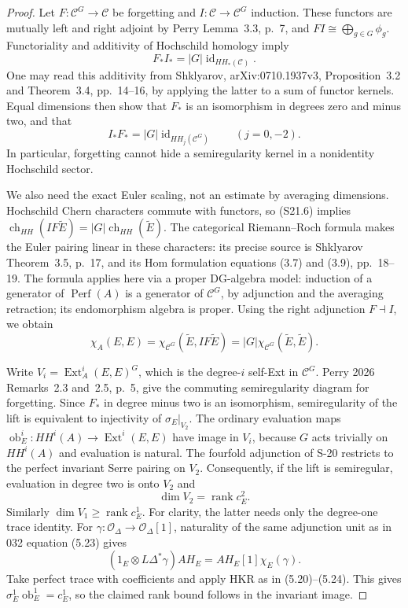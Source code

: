 \documentclass[11pt,a4paper]{article}
\theoremstyle{definition}
\begin{document}
\begin{proof}
Let $F:\mathcal C^G\to\mathcal C$ be forgetting and
$I:\mathcal C\to\mathcal C^G$ induction. These functors
are mutually left and right adjoint by Perry Lemma~3.3,
p.~7, and $FI\cong\bigoplus_{g\in G}\phi_g$.
Functoriality and additivity of Hochschild homology imply
\[
 F_*I_*=|G|\operatorname{id}_{HH_*(\mathcal C)}.
\]
One may read this additivity from Shklyarov, arXiv:0710.1937v3,
Proposition~3.2 and Theorem~3.4, pp.~14--16, by applying
the latter to a sum of functor kernels.
Equal dimensions then show that $F_*$ is an isomorphism
in degrees zero and minus two, and that
\[
 I_*F_*=|G|\operatorname{id}_{HH_j(\mathcal C^G)}
       \qquad(j=0,-2).
 \tag{S21.6}
\]
In particular, forgetting cannot hide a semiregularity
kernel in a nonidentity Hochschild sector.

We also need the exact Euler scaling, not an estimate by
averaging dimensions. Hochschild Chern characters commute
with functors, so (S21.6) implies
$\operatorname{ch}_{HH}(IF\widetilde E)
=|G|\operatorname{ch}_{HH}(\widetilde E)$.
The categorical Riemann--Roch formula makes the Euler
pairing linear in these characters: its precise source is
Shklyarov Theorem~3.5, p.~17, and its Hom formulation
equations (3.7) and (3.9), pp.~18--19.
The formula applies here via a proper DG-algebra model:
induction of a generator of $\operatorname{Perf}(A)$ is
a generator of $\mathcal C^G$, by adjunction and the
averaging retraction; its endomorphism algebra is proper.
Using the right adjunction $F\dashv I$, we obtain
\[
 \chi_A(E,E)
 =\chi_{\mathcal C^G}(\widetilde E,IF\widetilde E)
 =|G|\chi_{\mathcal C^G}(\widetilde E,\widetilde E).
 \tag{S21.7}
\]

Write $V_i=\operatorname{Ext}^i_A(E,E)^G$, which is the
degree-$i$ self-Ext in $\mathcal C^G$.
Perry 2026 Remarks~2.3 and~2.5, p.~5, give the commuting
semiregularity diagram for forgetting. Since $F_*$ in
degree minus two is an isomorphism, semiregularity of the
lift is equivalent to injectivity of
$\sigma_E|_{V_2}$.
The ordinary evaluation maps
$\operatorname{ob}_E^i:HH^i(A)\to\operatorname{Ext}^i(E,E)$
have image in $V_i$, because $G$ acts trivially on
$HH^i(A)$ and evaluation is natural.
The fourfold adjunction of S-20 restricts to the perfect
invariant Serre pairing on $V_2$. Consequently, if the
lift is semiregular, evaluation in degree two is onto
$V_2$ and
\[
 \dim V_2=\operatorname{rank}c_E^2.
 \tag{S21.8}
\]
Similarly $\dim V_1\ge\operatorname{rank}c_E^1$.
For clarity, the latter needs only the degree-one trace
identity. For $\gamma:\mathcal O_\Delta\to
\mathcal O_\Delta[1]$, naturality of the same adjunction
unit as in 032 equation (5.23) gives
\[
 (1_E\otimes L\Delta^*\gamma)AH_E
     =AH_E[1]\chi_E(\gamma).
\]
Take perfect trace with coefficients and apply HKR as in
(5.20)--(5.24). This gives
$\sigma_E^1\operatorname{ob}_E^1=c_E^1$,
so the claimed rank bound follows in the invariant image.


\end{proof}
\end{document}
